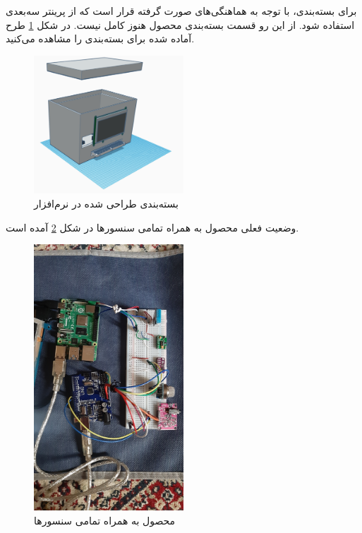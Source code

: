 برای بسته‌بندی، با توجه به هماهنگی‌های صورت گرفته قرار است که از پرینتر سه‌بعدی استفاده شود. از این رو قسمت بسته‌بندی محصول هنوز کامل نیست. در شکل \ref{fig:9} طرح آماده شده برای بسته‌بندی را مشاهده می‌کنید.

\begin{figure}[h]
	\centering
	\includegraphics[width=0.5\textwidth]{figs/package.png}
	
	\caption{بسته‌بندی طراحی شده در نرم‌افزار }
	\label{fig:9}
\end{figure}

وضعیت فعلی محصول به همراه تمامی سنسور‌ها در شکل \ref{fig:10} آمده است.


\begin{figure}[h]
	\centering
	\includegraphics[width=0.5\textwidth]{figs/all.jpg}
	
	\caption{محصول به همراه تمامی سنسور‌ها }
	\label{fig:10}
\end{figure}

